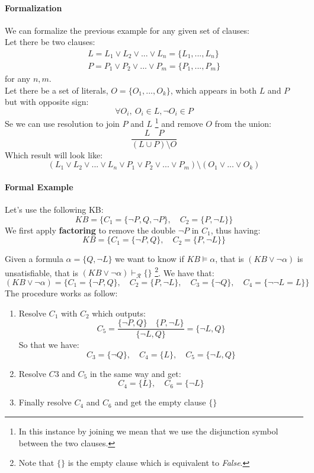 \documentclass[10pt,a4paper]{article}
\begin{document}
\paragraph{Formalization}
We can formalize the previous example for any given set of clauses:\\
Let there be two clauses:
\begin{align}
L=L_1\vee L_2 \vee...\vee L_n=\lbrace L_1,...,L_n\rbrace\\ 
P=P_1\vee P_2 \vee...\vee P_m=\lbrace P_1,...,P_m\rbrace
\end{align}
for any $n,m$.\\
Let there be a set of literals, $O=\lbrace O_1,...,O_k\rbrace$, which appears in both $L$ and $P$ but with opposite sign:
\[\forall O_i,\ O_i \in L, \neg O_i \in P\]
Se we can use resolution to join $P$ and $L$ \footnote{In this instance by joining we mean that we use the disjunction symbol between the two clauses.} and remove $O$ from the union:
\[\frac{L\quad P}{(L\cup P)\setminus O}\]
Which result will look like:
\[(L_1\vee L_2 \vee...\vee L_n\vee P_1\vee P_2 \vee...\vee P_m)\setminus (O_1\vee...\vee O_k)  \]

\paragraph{Formal Example}
Let's use the following KB:
\[KB=\lbrace C_1=\lbrace\neg P,Q,\neg P\rbrace,\quad C_2=\lbrace P,\neg L\rbrace \rbrace\]
We first apply \textbf{factoring} to remove the double $\neg P$ in $C_1$, thus having:
\[KB=\lbrace C_1=\lbrace\neg P,Q\rbrace,\quad C_2=\lbrace P,\neg L\rbrace \rbrace\]

Given a formula $\alpha=\lbrace Q,\neg L\rbrace$ we want to know if $KB \models \alpha$, that is $(KB \vee \neg \alpha)$ is unsatisfiable, that is  $(KB \vee \neg \alpha) \vdash_{\mathcal{R}} \{\}$ \footnote{Note that $\{\}$ is the empty clause which is equivalent to \textit{False}.}. We have that:
\[(KB \vee \neg \alpha)=\lbrace C_1=\lbrace\neg P,Q\rbrace,\quad C_2=\lbrace P,\neg L\rbrace,\quad C_3=\lbrace \neg Q \rbrace,\quad C_4=\lbrace \neg \neg L=L\rbrace \rbrace\]
The procedure works as follow:
\begin{enumerate}
\item Resolve $C_1$ with $C_2$ which outputs:
\[C_5=\frac{\lbrace\neg P,Q\rbrace\quad \lbrace P,\neg L\rbrace}{\lbrace\neg L,Q\rbrace}=\lbrace\neg L,Q\rbrace\]
So that we have:
\[ C_3=\lbrace \neg Q \rbrace,\quad C_4=\lbrace L\rbrace ,\quad C_5=\lbrace\neg L,Q\rbrace \]
\item Resolve $C3$ and $C_5$ in the same way and get:
\[C_4=\lbrace L\rbrace ,\quad C_6=\lbrace\neg L\rbrace \]
\item Finally resolve $C_4$ and $C_6$ and get the empty clause $\{\}$
\end{enumerate}
\end{document}
